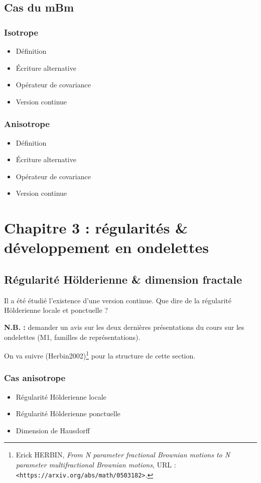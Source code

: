 \documentclass[11pt]{article}
\begin{document}
\subsection{Cas du mBm}
\label{sec:org7f9495c}
\subsubsection{Isotrope}
\label{sec:org4c2f5d5}
\begin{itemize}
\item Définition
\item Écriture alternative
\item Opérateur de covariance
\item Version continue
\end{itemize}
\subsubsection{Anisotrope}
\label{sec:orgf9a607a}
\begin{itemize}
\item Définition
\item Écriture alternative
\item Opérateur de covariance
\item Version continue
\end{itemize}

\section{Chapitre 3 : régularités \& développement en ondelettes}
\label{sec:org1e9c13f}
\subsection{Régularité Hölderienne \& dimension fractale}
\label{sec:orgc9248a4}
Il a été étudié l'existence d'une version continue. Que dire de la
régularité Hölderienne locale et ponctuelle ?

\textbf{N.B. :} demander un avis sur les deux dernières présentations du
cours sur les ondelettes (M1, familles de représentations).

On va suivre (Herbin2002)\footnote{Erick HERBIN, \emph{From N parameter fractional Brownian motions to N
parameter multifractional Brownian motions}, URL :
\texttt{<https://arxiv.org/abs/math/0503182>}.} pour la structure de cette section.
\subsubsection{Cas anisotrope}
\label{sec:orgead4753}
\begin{itemize}
\item Régularité Hölderienne locale
\item Régularité Hölderienne ponctuelle
\item Dimension de Hausdorff
\end{itemize}
\end{document}

